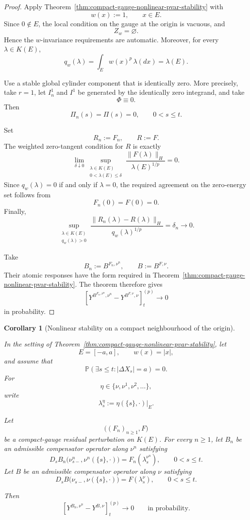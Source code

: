 \documentclass[a4paper,10pt]{article}
\newtheorem{corollary}[thm]{Corollary}
\renewcommand{\P}{\mathbb P}
\begin{document}
\begin{proof}
Apply
Theorem~\ref{thm:compact-gauge-nonlinear-pvar-stability}
with
\[
        w(x):=1,
        \qquad x\in E.
\]
Since \(0\notin E\), the local condition on the gauge at the origin is
vacuous, and
\[
        Z_w=\varnothing.
\]
Hence the \(w\)-invariance requirements are automatic. Moreover, for
every \(\lambda\in K(E)\),
\[
        q_w(\lambda)
        =
        \int_Ew(x)^p\,\lambda(dx)
        =
        \lambda(E).
\]

Use a stable global cylinder component that is identically zero.
More precisely, take
\(r=1\), let \(I_n^1\) and \(I^1\) be generated by the identically
zero integrand, and take
\[
        \Phi\equiv0.
\]
Then
\[
        \Pi_n(s)=\Pi(s)=0,
        \qquad 0<s\le t.
\]

Set
\[
        R_n:=F_n,
        \qquad
        R:=F.
\]
The weighted zero-tangent condition for \(R\) is exactly
\[
\lim_{\delta\downarrow0}
\sup_{\substack{\lambda\in K(E)\\
                 0<\lambda(E)\le\delta}}
\frac{\lVert F(\lambda)\rVert_H}
     {\lambda(E)^{1/p}}
=
0.
\]
Since \(q_w(\lambda)=0\) if and only if \(\lambda=0\), the required
agreement on the zero-energy set follows from
\[
        F_n(0)=F(0)=0.
\]
Finally,
\[
\sup_{\substack{\lambda\in K(E)\\q_w(\lambda)>0}}
\frac{\lVert R_n(\lambda)-R(\lambda)\rVert_H}
     {q_w(\lambda)^{1/p}}
=
\delta_n
\longrightarrow0.
\]

Take
\[
        B_n:=B^{F_n,\nu^n},
        \qquad
        B:=B^{F,\nu}.
\]
Their atomic responses have the form required in
Theorem~\ref{thm:compact-gauge-nonlinear-pvar-stability}. The theorem
therefore gives
\[
\left[
Y^{B^{F_n,\nu^n},\nu^n}
-
Y^{B^{F,\nu},\nu}
\right]^{(p)}_t
\longrightarrow0
\]
in probability.
\end{proof}
\begin{corollary}[Nonlinear stability on a compact neighbourhood of
the origin]
\label{cor:origin-neighbourhood-nonlinear-pvar-stability}

In the setting of
Theorem~\ref{thm:compact-gauge-nonlinear-pvar-stability}, let
\[
        E=[-a,a],
        \qquad
        w(x)=|x|,
\]
and assume that
\[
\P\left(
        \exists s\le t:
        |\Delta X_s|=a
\right)
=
0.
\]
For
\[
        \eta\in\{\nu,\nu^1,\nu^2,\ldots\},
\]
write
\[
        \lambda_s^\eta
        :=
        \eta(\{s\},\cdot)|_E.
\]

Let
\[
        \bigl((F_n)_{n\ge1},F\bigr)
\]
be a compact-gauge residual perturbation on \(K(E)\). For every
\(n\ge1\), let \(B_n\) be an admissible compensator operator along
\(\nu^n\) satisfying
\[
D_sB_n
\bigl(
        \nu^n_{s-},
        \nu^n(\{s\},\cdot)
\bigr)
=
F_n(\lambda_s^{\nu^n}),
\qquad 0<s\le t.
\]
Let \(B\) be an admissible compensator operator along \(\nu\)
satisfying
\[
D_sB
\bigl(
        \nu_{s-},
        \nu(\{s\},\cdot)
\bigr)
=
F(\lambda_s^\nu),
\qquad 0<s\le t.
\]

Then
\[
        [Y^{B_n,\nu^n}-Y^{B,\nu}]^{(p)}_t
        \longrightarrow0
        \qquad\text{in probability}.
\]
\end{corollary}
\end{document}
